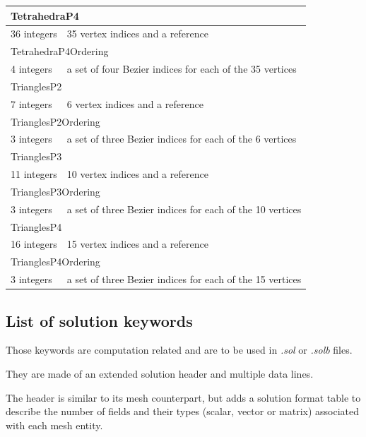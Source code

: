 \documentclass[a4paper,12pt]{article}
\begin{document}
\begin{longtable}{|m{4cm}|m{11cm}|}
\multicolumn{2}{|l|}{TetrahedraP4} \\
\hline
36 integers & 35 vertex indices and a reference \\
\hline\hline

\multicolumn{2}{|l|}{TetrahedraP4Ordering} \\
\hline
4 integers & a set of four Bezier indices for each of the 35 vertices \\
\hline\hline

\multicolumn{2}{|l|}{TrianglesP2} \\
\hline
7 integers & 6 vertex indices and a reference \\
\hline\hline

\multicolumn{2}{|l|}{TrianglesP2Ordering} \\
\hline
3 integers & a set of three Bezier indices for each of the 6 vertices \\
\hline\hline

\multicolumn{2}{|l|}{TrianglesP3} \\
\hline
11 integers & 10 vertex indices and a reference \\
\hline\hline

\multicolumn{2}{|l|}{TrianglesP3Ordering} \\
\hline
3 integers & a set of three Bezier indices for each of the 10 vertices \\
\hline\hline

\multicolumn{2}{|l|}{TrianglesP4} \\
\hline
16 integers & 15 vertex indices and a reference \\
\hline\hline

\multicolumn{2}{|l|}{TrianglesP4Ordering} \\
\hline
3 integers & a set of three Bezier indices for each of the 15 vertices \\
\hline

\end{longtable}


\subsection{List of solution keywords}

Those keywords are computation related and are to be used in \emph{.sol} or \emph{.solb} files.

They are made of an extended solution header and multiple data lines.

The header is similar to its mesh counterpart, but adds a solution format table to describe the number of fields and their types (scalar, vector or matrix) associated with each mesh entity.
\end{document}
